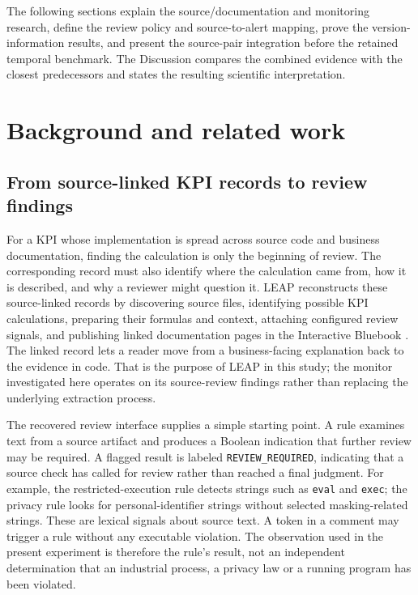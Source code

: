 \documentclass[preprint,11pt]{elsarticle}
\newcommand{\code}[1]{\texttt{#1}}
\begin{document}
The following sections explain the source/documentation and monitoring research, define the review policy and source-to-alert mapping, prove the version-information results, and present the source-pair integration before the retained temporal benchmark. The Discussion compares the combined evidence with the closest predecessors and states the resulting scientific interpretation.

\section{Background and related work}
\subsection{From source-linked KPI records to review findings}

For a KPI whose implementation is spread across source code and business documentation, finding the calculation is only the beginning of review. The corresponding record must also identify where the calculation came from, how it is described, and why a reviewer might question it. LEAP reconstructs these source-linked records by discovering source files, identifying possible KPI calculations, preparing their formulas and context, attaching configured review signals, and publishing linked documentation pages in the Interactive Bluebook \cite{mouawad2026architecture}. The linked record lets a reader move from a business-facing explanation back to the evidence in code. That is the purpose of LEAP in this study; the monitor investigated here operates on its source-review findings rather than replacing the underlying extraction process.

The recovered review interface supplies a simple starting point. A rule examines text from a source artifact and produces a Boolean indication that further review may be required. A flagged result is labeled \code{REVIEW\_REQUIRED}, indicating that a source check has called for review rather than reached a final judgment. For example, the restricted-execution rule detects strings such as \code{eval} and \code{exec}; the privacy rule looks for personal-identifier strings without selected masking-related strings. These are lexical signals about source text. A token in a comment may trigger a rule without any executable violation. The observation used in the present experiment is therefore the rule's result, not an independent determination that an industrial process, a privacy law or a running program has been violated.
\end{document}
